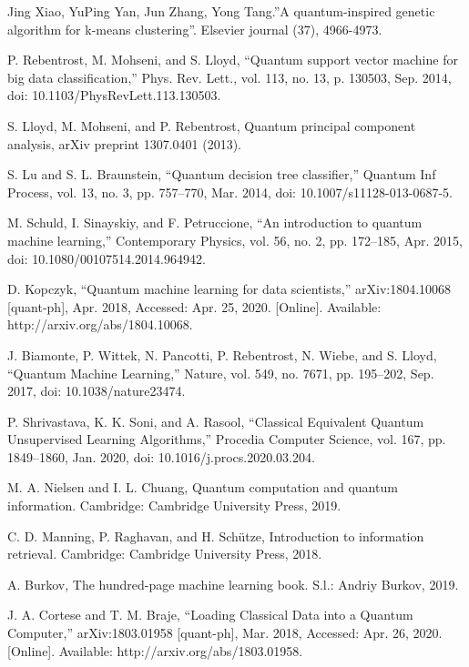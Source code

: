 \documentclass[conference]{IEEEtran}
\begin{document}
\begin{thebibliography}{00}

Jing Xiao, YuPing Yan, Jun Zhang, Yong Tang.”A quantum-inspired genetic algorithm for k-means clustering”. Elsevier
journal (37), 4966-4973. 

P. Rebentrost, M. Mohseni, and S. Lloyd, “Quantum support vector machine for big data classification,” Phys. Rev. Lett., vol. 113, no. 13, p. 130503, Sep. 2014, doi: 10.1103/PhysRevLett.113.130503.

 S. Lloyd, M. Mohseni, and P. Rebentrost, Quantum principal component analysis, arXiv preprint 1307.0401 (2013).

S. Lu and S. L. Braunstein, “Quantum decision tree classifier,” Quantum Inf Process, vol. 13, no. 3, pp. 757–770, Mar. 2014, doi: 10.1007/s11128-013-0687-5.

M. Schuld, I. Sinayskiy, and F. Petruccione, “An introduction to quantum machine learning,” Contemporary Physics, vol. 56, no. 2, pp. 172–185, Apr. 2015, doi: 10.1080/00107514.2014.964942.

D. Kopczyk, “Quantum machine learning for data scientists,” arXiv:1804.10068 [quant-ph], Apr. 2018, Accessed: Apr. 25, 2020. [Online]. Available: http://arxiv.org/abs/1804.10068.

J. Biamonte, P. Wittek, N. Pancotti, P. Rebentrost, N. Wiebe, and S. Lloyd, “Quantum Machine Learning,” Nature, vol. 549, no. 7671, pp. 195–202, Sep. 2017, doi: 10.1038/nature23474.

P. Shrivastava, K. K. Soni, and A. Rasool, “Classical Equivalent Quantum Unsupervised Learning Algorithms,” Procedia Computer Science, vol. 167, pp. 1849–1860, Jan. 2020, doi: 10.1016/j.procs.2020.03.204.

 M. A. Nielsen and I. L. Chuang, Quantum computation and quantum information. Cambridge: Cambridge University Press, 2019.

 C. D. Manning, P. Raghavan, and H. Schütze, Introduction to information retrieval. Cambridge: Cambridge University Press, 2018.

 A. Burkov, The hundred-page machine learning book. S.l.: Andriy Burkov, 2019.

 J. A. Cortese and T. M. Braje, “Loading Classical Data into a Quantum Computer,” arXiv:1803.01958 [quant-ph], Mar. 2018, Accessed: Apr. 26, 2020. [Online]. Available: http://arxiv.org/abs/1803.01958.


\end{thebibliography}
\end{document}
